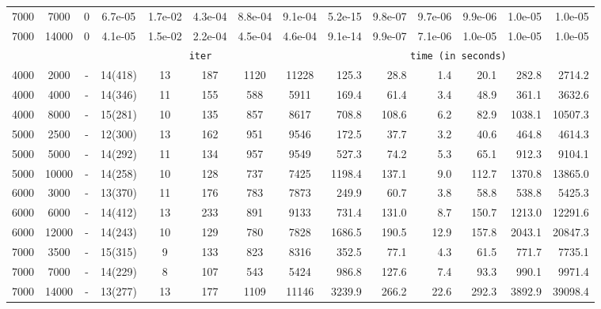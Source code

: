 \documentclass[10pt]{article}
\begin{document}
\begin{table}[h]
{{\begin{tabular}{|cc|cccccc|rrrrrr|}
7000 & 7000 & 0 & 6.7e-05 & 1.7e-02 & 4.3e-04 & 8.8e-04 & 9.1e-04 & 5.2e-15 & 9.8e-07 & 9.7e-06 & 9.9e-06 & 1.0e-05 & 1.0e-05 \\
7000 & 14000 & 0 & 4.1e-05 & 1.5e-02 & 2.2e-04 & 4.5e-04 & 4.6e-04 & 9.1e-14 & 9.9e-07 & 7.1e-06 & 1.0e-05 & 1.0e-05 & 1.0e-05 \\
		\hline
		     &       & \multicolumn{6}{c|}{\texttt{iter}} & \multicolumn{6}{c|}{\texttt{time (in seconds)}}\\ \hline
4000 & 2000 & - & 14(418) & 13 & 187 & 1120 & 11228 & 125.3 &  28.8 &   1.4 &  20.1 & 282.8 & 2714.2 \\
4000 & 4000 & - & 14(346) & 11 & 155 & 588 & 5911 & 169.4 &  61.4 &   3.4 &  48.9 & 361.1 & 3632.6 \\
4000 & 8000 & - & 15(281) & 10 & 135 & 857 & 8617 & 708.8 & 108.6 &   6.2 &  82.9 & 1038.1 & 10507.3 \\
5000 & 2500 & - & 12(300) & 13 & 162 & 951 & 9546 & 172.5 &  37.7 &   3.2 &  40.6 & 464.8 & 4614.3 \\
5000 & 5000 & - & 14(292) & 11 & 134 & 957 & 9549 & 527.3 &  74.2 &   5.3 &  65.1 & 912.3 & 9104.1 \\
5000 & 10000 & - & 14(258) & 10 & 128 & 737 & 7425 & 1198.4 & 137.1 &   9.0 & 112.7 & 1370.8 & 13865.0 \\
6000 & 3000 & - & 13(370) & 11 & 176 & 783 & 7873 & 249.9 &  60.7 &   3.8 &  58.8 & 538.8 & 5425.3 \\
6000 & 6000 & - & 14(412) & 13 & 233 & 891 & 9133 & 731.4 & 131.0 &   8.7 & 150.7 & 1213.0 & 12291.6 \\
6000 & 12000 & - & 14(243) & 10 & 129 & 780 & 7828 & 1686.5 & 190.5 &  12.9 & 157.8 & 2043.1 & 20847.3 \\
7000 & 3500 & - & 15(315) & 9 & 133 & 823 & 8316 & 352.5 &  77.1 &   4.3 &  61.5 & 771.7 & 7735.1 \\
7000 & 7000 & - & 14(229) & 8 & 107 & 543 & 5424 & 986.8 & 127.6 &   7.4 &  93.3 & 990.1 & 9971.4 \\
7000 & 14000 & - & 13(277) & 13 & 177 & 1109 & 11146 & 3239.9 & 266.2 &  22.6 & 292.3 & 3892.9 & 39098.4 \\
		\hline
\end{tabular}}}
\end{table}
\end{document}
